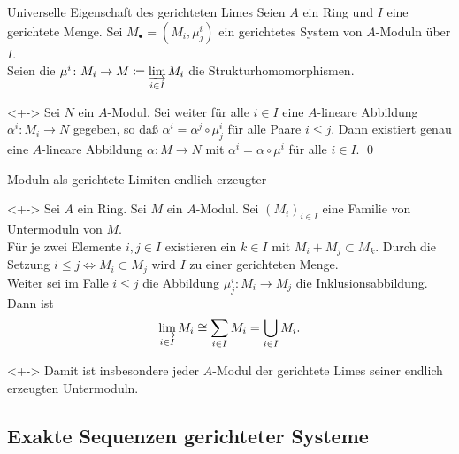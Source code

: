 \begin{frame}{Universelle Eigenschaft des gerichteten Limes}
	Seien \(A\) ein Ring und \(I\) eine gerichtete Menge. Sei
	\(M_\bullet = (M_i, \mu^i_j)\) ein gerichtetes System von \(A\)-Moduln über
	\(I\).
	\\
	Seien die \(\mu^i\colon M_i \to M \coloneqq \varinjlim\limits_{i \in I} M_i\) die
	Strukturhomomorphismen.
	\begin{proposition}<+->
		Sei \(N\) ein \(A\)-Modul. Sei weiter für alle \(i \in I\) eine \(A\)-lineare
		Abbildung \(\alpha^i\colon M_i \to N\) gegeben, so daß \(\alpha^i = \alpha^j \circ \mu^i_j\)
		für alle Paare \(i \le j\). Dann existiert genau eine \(A\)-lineare
		Abbildung \(\alpha\colon M \to N\) mit \(\alpha^i = \alpha \circ \mu^i\)
		für alle \(i \in I\).
		\qed
	\end{proposition}
\end{frame}

\begin{frame}{Moduln als gerichtete Limiten endlich erzeugter}
	\begin{example}<+->
		Sei \(A\) ein Ring. 
		Sei \(M\) ein \(A\)-Modul.
		Sei \((M_i)_{i \in I}\) eine Familie von Untermoduln von \(M\).
		\\
		Für je zwei Elemente \(i, j \in I\) existieren ein \(k \in I\) mit
		\(M_i + M_j \subset M_k\). Durch die Setzung \(i \le j \iff
		M_i \subset M_j\) wird \(I\) zu einer gerichteten Menge.
		\\
		Weiter sei im Falle \(i \le j\) die Abbildung \(\mu^i_j\colon M_i \to M_j\)
		die Inklusionsabbildung.
		\\
		Dann ist
		\[
			\varinjlim\limits_{i \in I} M_i \cong \sum\limits_{i \in I} M_i
			= \bigcup\limits_{i \in I} M_i.
		\]
	\end{example}
	\begin{visibleenv}<+->
		Damit ist insbesondere jeder \(A\)-Modul der gerichtete Limes seiner
		endlich erzeugten Untermoduln.
	\end{visibleenv}
\end{frame}

\subsection{Exakte Sequenzen gerichteter Systeme}

